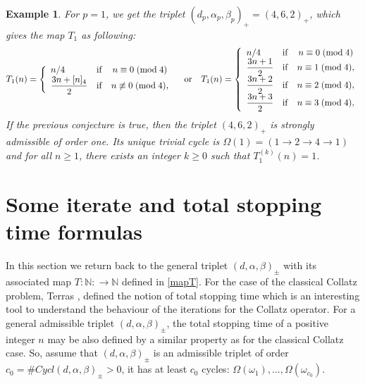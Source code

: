 \documentclass[11pt,a4paper]{article}
\newtheorem{example}{Example}[section]
\newcommand*\modd[3]{#1\equiv#2\;( {\rm mod}\;  #3)}
\newcommand*\notmodd[3]{#1\not\equiv#2\;( {\rm mod}\;  #3)}
\begin{document}
\begin{example}
	For $p=1$, we get the triplet $(d_p,\alpha_p,\beta_p)_{+} =(4,6,2)_{+}$, which gives the map $T_1$ as following:
	\begin{equation}\label{CollazConjectureV2}
		T_1(n)=\left\{\begin{array}{lcc}
			n/4&\mathrm{if}& \modd{n}{0}{4}\\
			\dfrac{3n+[ n]_{4}}{2}&\mathrm{if}& \notmodd{n}{0}{4},\\
		\end{array}\right.
		\quad\mbox{or}\quad
		T_1(n)=\left\{\begin{array}{lcc}
			n/4&\mathrm{if}& \modd{n}{0}{4}\\
			\dfrac{3n+1}{2}&\mathrm{if}& \modd{n}{1}{4},\\
			\dfrac{3n+2}{2}&\mathrm{if}& \modd{n}{2}{4},\\
			\dfrac{3n+3}{2}&\mathrm{if}& \modd{n}{3}{4},\\
		\end{array}\right.
	\end{equation}
	If the previous conjecture is true, then the triplet $(4,6,2)_+$ is  strongly admissible  of order one. Its  unique trivial cycle is $\Omega(1)=(1\rightarrow 2\rightarrow 4\rightarrow 1)$ and for all $n\geq 1$, there exists an integer $k\geq 0$ such that $T_1^{(k)}(n)=1$.
\end{example}






\section{Some  iterate and total stopping time formulas}\label{Sec:Toatal Stopping Time}
In this section we return back to the general triplet $(d,\alpha,\beta)_{\pmb{\pm}}$ with its associated map 
$T:\mathbb{N}:\longrightarrow \mathbb{N}$ defined  in   \eqref{mapT}.
For the case of the classical Collatz problem, Terras \cite{Terras1976}, defined the  notion of  total stopping  time which is an interesting tool to understand the behaviour of the iterations for the Collatz operator.  For  a general  admissible   triplet $(d,\alpha,\beta)_{\pmb{\pm}}$,  the  total stopping time of a positive integer $n$ may be also defined  by a similar property as for the classical Collatz case. So, assume that  $(d,\alpha,\beta)_{\pmb{\pm}}$ is an   admissible  triplet of order $c_0=\#Cycl(d,\alpha,\beta)_{\pmb{\pm}}>0$,  it has at least $c_0$ cycles: $\Omega(\omega_1),\ldots, \Omega(\omega_{c_0})$.  
\end{document}

